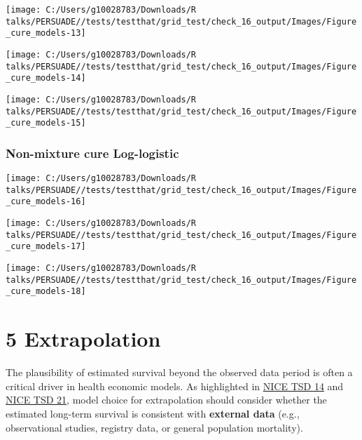 \documentclass[
]{article}
\begin{document}
\begin{flushleft}\texttt{[image: C:/Users/g10028783/Downloads/R talks/PERSUADE//tests/testthat/grid\_test/check\_16\_output/Images/Figure\_cure\_models-13]} \end{flushleft}

\begin{flushleft}\texttt{[image: C:/Users/g10028783/Downloads/R talks/PERSUADE//tests/testthat/grid\_test/check\_16\_output/Images/Figure\_cure\_models-14]} \end{flushleft}

\begin{flushleft}\texttt{[image: C:/Users/g10028783/Downloads/R talks/PERSUADE//tests/testthat/grid\_test/check\_16\_output/Images/Figure\_cure\_models-15]} \end{flushleft}

\clearpage

\subsubsection{Non-mixture cure
Log-logistic}\label{non-mixture-cure-log-logistic}

\begin{flushleft}\texttt{[image: C:/Users/g10028783/Downloads/R talks/PERSUADE//tests/testthat/grid\_test/check\_16\_output/Images/Figure\_cure\_models-16]} \end{flushleft}

\begin{flushleft}\texttt{[image: C:/Users/g10028783/Downloads/R talks/PERSUADE//tests/testthat/grid\_test/check\_16\_output/Images/Figure\_cure\_models-17]} \end{flushleft}

\begin{flushleft}\texttt{[image: C:/Users/g10028783/Downloads/R talks/PERSUADE//tests/testthat/grid\_test/check\_16\_output/Images/Figure\_cure\_models-18]} \end{flushleft}

\clearpage

\section{5 Extrapolation}\label{extrapolation}

The plausibility of estimated survival beyond the observed data period
is often a critical driver in health economic models. As highlighted in
\href{https://nicedsu.org.uk/wp-content/uploads/2016/03/NICE-DSU-TSD-Survival-analysis.updated-March-2013.v2.pdf}{NICE
TSD 14} and \href{https://www.sheffield.ac.uk/media/34188/download}{NICE
TSD 21}, model choice for extrapolation should consider whether the
estimated long-term survival is consistent with \textbf{external data}
(e.g., observational studies, registry data, or general population
mortality).
\end{document}
